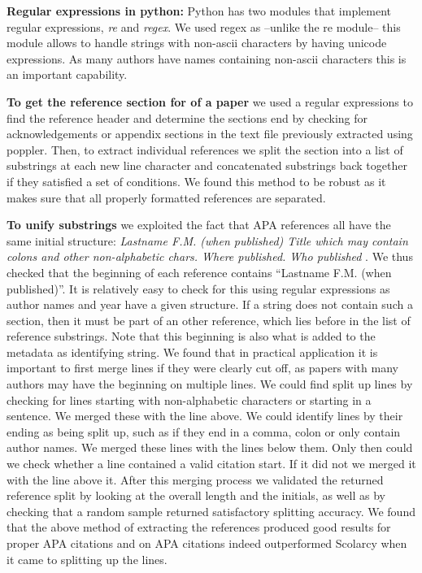 \documentclass[article,twocolumn]{IEEEtran}
\begin{document}
\textbf{Regular expressions in python:} Python has two modules that
implement regular expressions, \emph{re} and \emph{regex}. We used regex
as --unlike the re module-- this module allows to handle strings with
non-ascii characters by having unicode expressions. As many authors have
names containing non-ascii characters this is an important capability.

\textbf{To get the reference section for of a paper} we used a regular
expressions to find the reference header and determine the sections end
by checking for acknowledgements or appendix sections in the text file
previously extracted using poppler. Then, to extract individual
references we split the section into a list of substrings at each new
line character and concatenated substrings back together if they
satisfied a set of conditions. We found this method to be robust as it
makes sure that all properly formatted references are separated.

\textbf{To unify substrings} we exploited the fact that APA references
all have the same initial structure: \emph{Lastname F.M. (when
published) Title which may contain colons and other non-alphabetic
chars. Where published. Who published} \cite{apaformat}. We thus checked
that the beginning of each reference contains ``Lastname F.M. (when
published)''. It is relatively easy to check for this using regular
expressions as author names and year have a given structure. If a string
does not contain such a section, then it must be part of an other
reference, which lies before in the list of reference substrings. Note
that this beginning is also what is added to the metadata as identifying
string. We found that in practical application it is important to first
merge lines if they were clearly cut off, as papers with many authors
may have the beginning on multiple lines. We could find split up lines
by checking for lines starting with non-alphabetic characters or
starting in a sentence. We merged these with the line above. We could
identify lines by their ending as being split up, such as if they end in
a comma, colon or only contain author names. We merged these lines with
the lines below them. Only then could we check whether a line contained
a valid citation start. If it did not we merged it with the line above
it. After this merging process we validated the returned reference split
by looking at the overall length and the initials, as well as by
checking that a random sample returned satisfactory splitting accuracy.
We found that the above method of extracting the references produced
good results for proper APA citations and on APA citations indeed
outperformed Scolarcy when it came to splitting up the lines.
\end{document}
